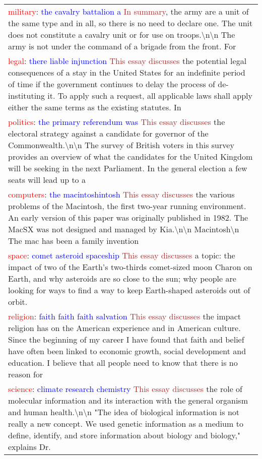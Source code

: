 \begin{table*}
\begin{tabular}{p{}}
\textcolor{red}{military}: \textcolor{blue}{the cavalry battalion a} \textcolor{brown}{In summary}, the army are a unit of the same type and in all, so there is no need to declare one. The unit does not constitute a cavalry unit or for use on troops.\textbackslash n\textbackslash n The army is not under the command of a brigade from the front. For \\
\textcolor{red}{legal}: \textcolor{blue}{there liable injunction} \textcolor{brown}{This essay discusses} the potential legal consequences of a stay in the United States for an indefinite period of time if the government continues to delay the process of de-instituting it. To apply such a request, all applicable laws shall apply either the same terms as the existing statutes. In \\
\textcolor{red}{politics}: \textcolor{blue}{the primary referendum was} \textcolor{brown}{This essay discusses} the electoral strategy against a candidate for governor of the Commonwealth.\textbackslash n\textbackslash n The survey of British voters in this survey provides an overview of what the candidates for the United Kingdom will be seeking in the next Parliament. In the general election a few seats will lead up to a \\
\textcolor{red}{computers}: \textcolor{blue}{the macintoshintosh} \textcolor{brown}{This essay discusses} the various problems of the Macintosh, the first two-year running environment. An early version of this paper was originally published in 1982. The MacSX was not designed and managed by Kia.\textbackslash n\textbackslash n Macintosh\textbackslash n The mac has been a family invention \\
\textcolor{red}{space}: \textcolor{blue}{comet asteroid spaceship} \textcolor{brown}{This essay discusses} a topic: the impact of two of the Earth's two-thirds comet-sized moon Charon on Earth, and why asteroids are so close to the sun; why people are looking for ways to find a way to keep Earth-shaped asteroids out of orbit. \\
\textcolor{red}{religion}: \textcolor{blue}{faith faith faith salvation} \textcolor{brown}{This essay discusses} the impact religion has on the American experience and in American culture. Since the beginning of my career I have found that faith and belief have often been linked to economic growth, social development and education. I believe that all people need to know that there is no reason for \\
\textcolor{red}{science}: \textcolor{blue}{climate research chemistry} \textcolor{brown}{This essay discusses} the role of molecular information and its interaction with the general organism and human health.\textbackslash n\textbackslash n "The idea of biological information is not really a new concept. We used genetic information as a medium to define, identify, and store information about biology and biology," explains Dr. \\

\end{tabular}
\end{table*}
